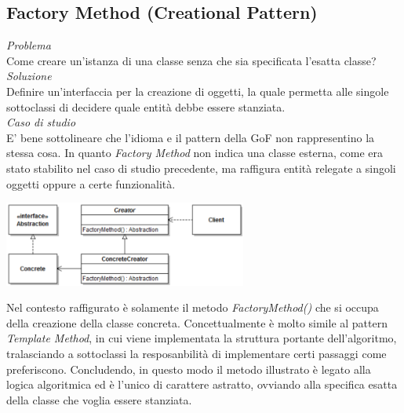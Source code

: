 \documentclass{article}
\begin{document}
\subsection*{Factory Method (Creational Pattern)}
\large
\textit{Problema}\\
Come creare un'istanza di una classe senza che sia specificata l'esatta classe?\vspace*{14pt}\\
\textit{Soluzione}\\
Definire un'interfaccia per la creazione di oggetti, la quale permetta alle singole sottoclassi di decidere quale entità debbe essere stanziata.\vspace*{14pt}\\
\textit{Caso di studio}\\
E' bene sottolineare che l'idioma e il pattern della GoF non rappresentino la stessa cosa. In quanto \textit{Factory Method} non indica una classe esterna, come era stato stabilito nel caso di studio precedente, ma raffigura entità relegate a singoli oggetti oppure a certe funzionalità.\vspace*{7pt}
\begin{center}
    \includegraphics[width=0.6\textwidth]{foto 2.png}
\end{center}
Nel contesto raffigurato è solamente il metodo \textit{FactoryMethod()} che si occupa della creazione della classe concreta. Concettualmente è molto simile al pattern \textit{Template Method}, in cui viene implementata la struttura portante dell'algoritmo, tralasciando a sottoclassi la resposanbilità di implementare certi passaggi come preferiscono. Concludendo, in questo modo il metodo illustrato è legato alla logica algoritmica ed è l'unico di carattere astratto, ovviando alla specifica esatta della classe che voglia essere stanziata.  
\end{document}
